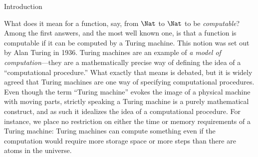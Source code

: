 \documentclass[../../../include/open-logic-section]{subfiles}
\begin{document}
 {Introduction}

What does it mean for a function, say, from $\Nat$ to $\Nat$ to be
\emph{computable}? Among the first answers, and the most well known
one, is that a function is computable if it can be computed by a
Turing machine. This notion was set out by Alan Turing in 1936.
Turing machines are an example of \emph{a model of computation}---they
are a mathematically precise way of defining the idea of a
``computational procedure.''  What exactly that means is debated, but
it is widely agreed that Turing machines are one way of specifying
computational procedures.  Even though the term ``Turing machine''
evokes the image of a physical machine with moving parts, strictly
speaking a Turing machine is a purely mathematical construct, and as
such it idealizes the idea of a computational procedure.  For
instance, we place no restriction on either the time or memory
requirements of a Turing machine: Turing machines can compute
something even if the computation would require more storage space or
more steps than there are atoms in the universe.
\end{document}
